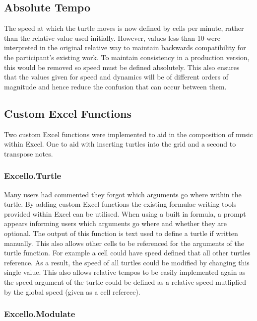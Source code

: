 \subsection{Absolute Tempo}

The speed at which the turtle moves is now defined by cells per minute, rather than the relative value used initially. However, values less than 10 were interpreted in the original relative way to maintain backwards compatibility for the participant's existing work. To maintain consistency in a production version, this would be removed so speed must be defined absolutely. This also ensures that the values given for speed and dynamics will be of different orders of magnitude and hence reduce the confusion that can occur between them.

\subsection{Custom Excel Functions}

Two custom Excel functions were implemented to aid in the composition of music within Excel. One to aid with inserting turtles into the grid and a second to transpose notes.

\subsubsection{Excello.Turtle}

Many users had commented they forgot which arguments go where within the turtle. By adding custom Excel functions the existing formulae writing tools provided within Excel can be utilised. When using a built in formula, a prompt appears informing users which arguments go where and whether they are optional. The output of this function is text used to define a turtle if written manually. This also allows other cells to be referenced for the arguments of the turtle function. For example a cell could have speed defined that all other turtles reference. As a result, the speed of all turtles could be modified by changing this single value. This also allows relative tempos to be easily implemented again as the speed argument of the turtle could be defined as a relative speed mutliplied by the global speed (given as a cell referece).

\subsubsection{Excello.Modulate}

